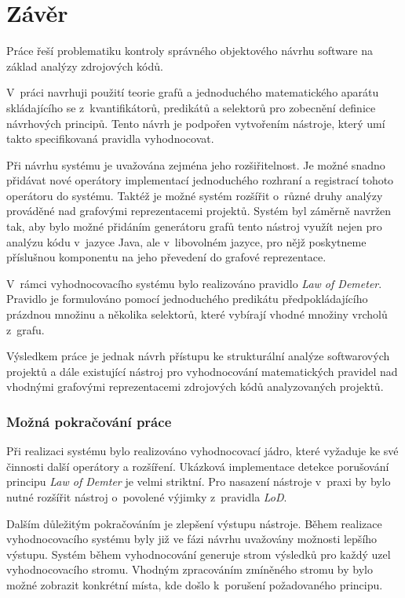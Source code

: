 \chapter{Závěr}

Práce řeší problematiku kontroly správného objektového návrhu software na základ analýzy zdrojových kódů.

V~práci navrhuji použití teorie grafů a jednoduchého matematického aparátu skládajícího se z~kvantifikátorů, predikátů a selektorů pro zobecnění definice návrhových principů. Tento návrh je podpořen vytvořením nástroje, který umí takto specifikovaná pravidla vyhodnocovat.

Při návrhu systému je uvažována zejména jeho rozšiřitelnost. Je možné snadno přidávat nové operátory implementací jednoduchého rozhraní a registrací tohoto operátoru do systému. Taktéž je možné systém rozšířit o~různé druhy analýzy prováděné nad grafovými reprezentacemi projektů. Systém byl záměrně navržen tak, aby bylo možné přidáním generátoru grafů tento nástroj využít nejen pro analýzu kódu v~jazyce Java, ale v~libovolném jazyce, pro nějž poskytneme příslušnou komponentu na jeho převedení do grafové reprezentace.

V~rámci vyhodnocovacího systému bylo realizováno pravidlo \emph{Law of Demeter}. Pravidlo je formulováno pomocí jednoduchého predikátu předpokládajícího prázdnou množinu a několika selektorů, které vybírají vhodné množiny vrcholů z~grafu.

Výsledkem práce je jednak návrh přístupu ke strukturální analýze softwarových projektů a dále existující nástroj pro vyhodnocování matematických pravidel nad vhodnými grafovými reprezentacemi zdrojových kódů analyzovaných projektů.

\subsection*{Možná pokračování práce}
Při realizaci systému bylo realizováno vyhodnocovací jádro, které vyžaduje ke své činnosti další operátory a rozšíření. Ukázková implementace detekce porušování principu \emph{Law of Demter} je velmi striktní. Pro nasazení nástroje v~praxi by bylo nutné rozšířit nástroj o~povolené výjimky z~pravidla \emph{LoD}.

Dalším důležitým pokračováním je zlepšení výstupu nástroje. Během realizace vyhodnocovacího systému byly již ve fázi návrhu uvažovány možnosti lepšího výstupu. Systém během vyhodnocování generuje strom výsledků pro každý uzel vyhodnocovacího stromu. Vhodným zpracováním zmíněného stromu by bylo možné zobrazit konkrétní místa, kde došlo k~porušení požadovaného principu.
